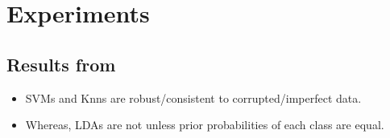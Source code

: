 \documentclass[a4paper, twocolumn]{article}
\begin{document}
\section{Experiments}
\label{sec-5}
\subsection{Results from \cite{cannings2018classification}}
\label{sec-5-1}

\begin{itemize}
\item SVMs and Knns are robust/consistent to corrupted/imperfect data.
\item Whereas, LDAs are not unless prior probabilities of each class are equal.
\end{itemize}
\end{document}
